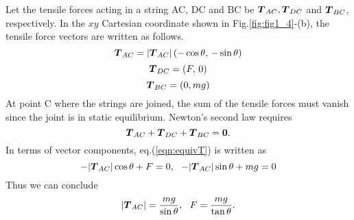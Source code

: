 \documentclass[10pt,a4j]{article}
\begin{document}
\begin{enumerate}
    {\small
        Let the tensile forces acting in a string AC, DC and BC be 
        $\mbox{\boldmath $T$}_{AC}, \mbox{\boldmath $T$}_{DC}$ and $\mbox{\boldmath $T$}_{BC}$, respectively. 
	In the $xy$ Cartesian coordinate shown in Fig.\ref{fig:fig1_4}-(b), 
	the tensile force vectors are written as follows.
        \[
            \mbox{\boldmath $T$}_{AC}=|\mbox{\boldmath $T$}_{AC}|\left(-\cos\theta,\, -\sin\theta \right)
        \]
        \[
            \mbox{\boldmath $T$}_{DC}=\left(F,\,0 \right)
        \]
        \[
            \mbox{\boldmath $T$}_{BC}=\left(0,mg \right)
        \]
        At point C where the strings are joined, the sum of the tensile forces must vanish since the joint is in static equilibrium. Newton's second law requires 
        \begin{equation}
            \mbox{\boldmath $T$}_{AC}+ \mbox{\boldmath $T$}_{DC}+\mbox{\boldmath $T$}_{BC}=\mbox{\boldmath $0$}.
            \label{eqn:equivT}
        \end{equation}
In terms of vector components, eq.(\ref{eqn:equivT}) is written as
        \begin{equation}
            -|\fat{T}_{AC}|\cos\theta+F=0
            ,\ \ 
            -|\fat{T}_{AC}|\sin\theta+mg=0
            \label{eqn:}
        \end{equation}
Thus we can conclude
        \begin{equation}
            |\fat{T}_{AC}|=\frac{mg}{\sin\theta}, \ \ 
            F=\frac{mg}{\tan\theta}. 
            \label{eqn:}
        \end{equation}
    }
\end{enumerate}
\end{document}
